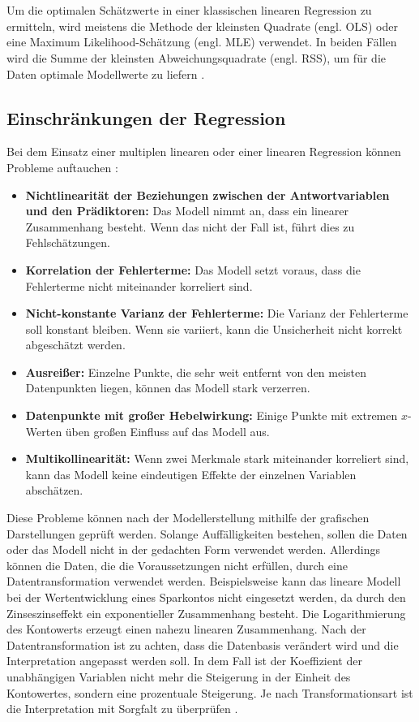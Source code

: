 \\\\
Um die optimalen Schätzwerte in einer klassischen linearen Regression zu ermitteln, wird meistens die Methode der kleinsten Quadrate (engl. \ac{OLS}) oder eine Maximum Likelihood-Schätzung (engl. \ac{MLE}) verwendet. In beiden Fällen wird die Summe der kleinsten Abweichungsquadrate (engl. \ac{RSS}), um für die Daten optimale Modellwerte zu liefern \cite[S. 246]{frick2021data}. 
\subsection{Einschränkungen der Regression}
\label{einschränkungenderregression}
Bei dem Einsatz einer multiplen linearen oder einer linearen Regression können Probleme auftauchen \cite{james2013introduction}: 
\begin{itemize}
    \item \textbf{Nichtlinearität der Beziehungen zwischen der Antwortvariablen und den Prädiktoren:} Das Modell nimmt an, dass ein linearer Zusammenhang besteht. Wenn das nicht der Fall ist, führt dies zu Fehlschätzungen. 
    \item \textbf{Korrelation der Fehlerterme:} Das Modell setzt voraus, dass die Fehlerterme nicht miteinander korreliert sind.
    \item \textbf{Nicht-konstante Varianz der Fehlerterme:} Die Varianz der Fehlerterme soll konstant bleiben. Wenn sie variiert, kann die Unsicherheit nicht korrekt abgeschätzt werden.
    \item \textbf{Ausreißer:} Einzelne Punkte, die sehr weit entfernt von den meisten Datenpunkten liegen, können das Modell stark verzerren.
    \item \textbf{Datenpunkte mit großer Hebelwirkung:} Einige Punkte mit extremen \(x\)-Werten üben großen Einfluss auf das Modell aus.
    \item \textbf{Multikollinearität:} Wenn zwei Merkmale stark miteinander korreliert sind, kann das Modell keine eindeutigen Effekte der einzelnen Variablen abschätzen.
\end{itemize}
Diese Probleme können nach der Modellerstellung mithilfe der grafischen Darstellungen geprüft werden. Solange Auffälligkeiten bestehen, sollen die Daten oder das Modell nicht in der gedachten Form verwendet werden. Allerdings können die Daten, die die Voraussetzungen nicht erfüllen, durch eine Datentransformation verwendet werden. Beispielsweise kann das lineare Modell bei der Wertentwicklung eines Sparkontos nicht eingesetzt werden, da durch den Zinseszinseffekt ein exponentieller Zusammenhang besteht. Die Logarithmierung des Kontowerts erzeugt einen nahezu linearen Zusammenhang. Nach der Datentransformation ist zu achten, dass die Datenbasis verändert wird und die Interpretation angepasst werden soll. In dem Fall ist der Koeffizient der unabhängigen Variablen nicht mehr die Steigerung in der Einheit des Kontowertes, sondern eine prozentuale Steigerung. Je nach Transformationsart ist die Interpretation mit Sorgfalt zu überprüfen \cite{akinkunmi2018data}. \\\\
